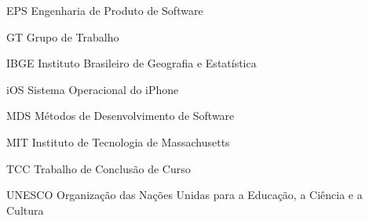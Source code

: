 \begin{siglas}
  \item[EPS] Engenharia de Produto de Software
  \item[GT] Grupo de Trabalho
  \item[IBGE] Instituto Brasileiro de Geografia e Estatística
  \item[iOS] Sistema Operacional do iPhone 
  \item[MDS] Métodos de Desenvolvimento de Software
  \item[MIT] Instituto de Tecnologia de Massachusetts
  \item[TCC] Trabalho de Conclusão de Curso 
  \item[UNESCO] Organização das Nações Unidas para a Educação, a Ciência e a Cultura
\end{siglas}
